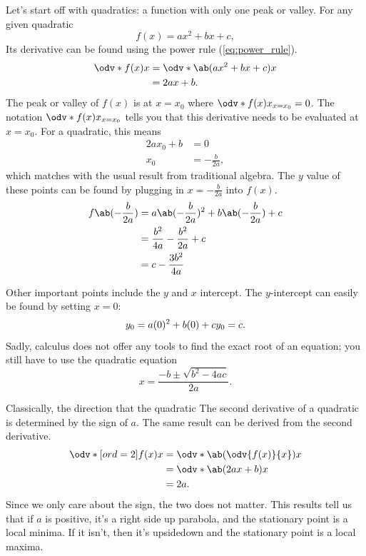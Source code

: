 Let's start off with quadratics: a function with only one peak or valley. For any given quadratic
\begin{equation}
	f(x) = ax^2 + bx + c,
\end{equation}
Its derivative can be found using the power rule (\cref{eq:power_rule}).
\begin{align}
	\odv*{f(x)}{x} & = \odv*{\ab(ax^2 + bx + c)}{x} \\
	               & = 2ax + b.
\end{align}
The peak or valley of $f(x)$ is at $x = x_0$ where $\odv*{f(x)}{x}_{x = x_0} = 0$. The notation $\odv*{f(x)}{x}_{x = x_0}$ tells you that this derivative needs to be evaluated at $x = x_0$. For a quadratic, this means
\begin{align}
	2ax_0 + b & = 0              \\
	x_0       & = -\frac{b}{2a},
\end{align}
which matches with the usual result from traditional algebra. The $y$ value of these points can be found by plugging in $x = -\frac{b}{2a}$ into $f(x)$.
\begin{align}
	f\ab(-\frac{b}{2a}) & = a\ab(-\frac{b}{2a})^2 + b\ab(-\frac{b}{2a}) + c  \\
	                    & = \frac{b^2}{4a} - \frac{b^2}{2a} + c              \\
	                    & = c - \frac{3b^2}{4a} \label{eq:parabola_y_vertex}
\end{align}

Other important points include the $y$ and $x$ intercept. The $y$-intercept can easily be found by setting $x = 0$:
\begin{equation}
	y_0 = a(0)^2 + b(0) + c \\
	y_0 = c.
\end{equation}
Sadly, calculus does not offer any tools to find the exact root of an equation; you still have to use the quadratic equation
\begin{equation}
	x = \frac{- b \pm \sqrt{b^2 - 4ac}}{2a}.
\end{equation}

Classically, the direction that the quadratic The second derivative of a quadratic is determined by the sign of $a$. The same result can be derived from the second derivative.
\begin{align}
	\odv*[ord = 2]{f(x)}{x} & = \odv*{\ab(\odv{f(x)}{x})}{x} \\
	                        & = \odv*{\ab(2ax + b)}{x}       \\
	                        & = 2a.
\end{align}
Since we only care about the sign, the two does not matter. This results tell us that if $a$ is positive, it's a right side up parabola, and the stationary point is a local minima. If it isn't, then it's upsidedown and the stationary point is a local maxima.

